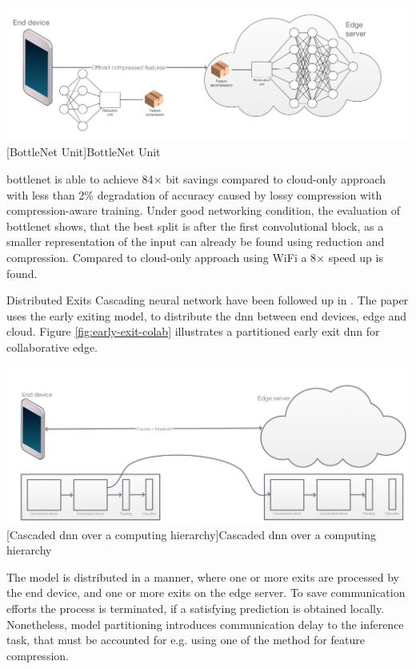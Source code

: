 \begin{enumdescript}
	\begin{minipage}[t]{\linewidth}
		\centering
		\includegraphics[width=.8\linewidth]{figures/models/bottlenet}
		[BottleNet Unit]{BottleNet Unit}
	\end{minipage}

	\gls{bottlenet} is able to achieve 84$\times$ bit savings compared to cloud-only approach with less than 2\% degradation of accuracy caused by lossy compression with compression-aware training. Under good networking condition, the evaluation of \gls{bottlenet} shows, that the best split is after the first convolutional block, as a smaller representation of the input can already be found using reduction and compression. Compared to cloud-only approach using WiFi a 8$\times$ speed up is found. 
	
	\item[Distributed Exits] Cascading neural network have been followed up in \cite{leroux_cascading_2017}. The paper uses the early exiting model, to distribute the \gls{dnn} between end devices, edge and cloud. Figure \ref{fig:early-exit-colab} illustrates a partitioned early exit \gls{dnn} for collaborative edge. 
	
	\begin{minipage}[t]{\linewidth}
		\centering
		\includegraphics[width=\linewidth]{figures/models/cascaded}
		[Cascaded \gls{dnn} over a computing hierarchy]{Cascaded \gls{dnn} over a computing hierarchy}
		\label{fig:early-exit-colab}
	\end{minipage}
	The model is distributed in a manner, where one or more exits are processed by the end device, and one or more exits on the edge server. To save communication efforts the process is terminated, if a satisfying prediction is obtained locally. Nonetheless, model partitioning introduces communication delay to the inference task, that must be accounted for e.g. using one of the method for feature compression.
	

\end{enumdescript}
